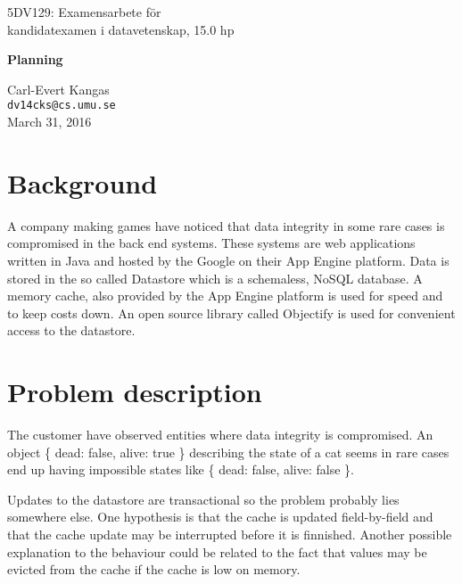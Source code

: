\documentclass[10pt, titlepage, oneside, a4paper]{article}
\begin{document}
\begin{center}
\begin{large}
  5DV129: Examensarbete för\\ kandidatexamen i datavetenskap, 15.0 hp
  
\vspace{8mm}
\begin{LARGE}\textbf{Planning}\end{LARGE}
\vspace{6mm}

\end{large}

Carl-Evert Kangas\\\texttt{dv14cks@cs.umu.se}\\March 31, 2016
\vspace{3mm}

\end{center}

\section*{Background}
 
A company making games have noticed that data integrity in some rare
cases is compromised in the back end systems. These systems are web
applications written in Java and hosted by the Google on their App Engine
platform. Data is stored in the so called Datastore which is a
schemaless, NoSQL database. A memory cache, also provided by the App
Engine platform is used for speed and to keep costs down. An open
source library called Objectify is used for convenient access to the datastore.

\section*{Problem description}

The customer have observed entities where data integrity is
compromised. An object \{ dead: false, alive: true \} describing the
state of a cat seems in rare cases end up having impossible states
like \{ dead: false, alive: false \}.

Updates to the datastore are transactional so the problem probably
lies somewhere else. One hypothesis is that the cache is updated
field-by-field and that the cache update may be interrupted before it
is finnished. Another possible explanation to the behaviour could be
related to the fact that values may be evicted from the cache if the
cache is low on memory.
\end{document}
